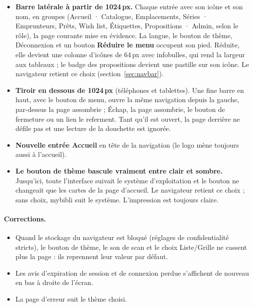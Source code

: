\begin{itemize}
  \item \textbf{Barre latérale à partir de 1024\,px.} Chaque entrée
        avec son icône et son nom, en groupes (Accueil ·
        Catalogue, Emplacements, Séries · Emprunteurs, Prêts,
        Wish list, Étiquettes, Propositions · Admin, selon le
        rôle), la page courante mise en évidence. La langue, le bouton
        de thème, Déconnexion et un bouton \textbf{Réduire le menu}
        occupent son pied. Réduite, elle devient une colonne d'icônes de
        64\,px avec infobulles, qui rend la largeur aux tableaux ; le
        badge des propositions devient une pastille sur son icône. Le
        navigateur retient ce choix (section~\ref{sec:navbar}).
  \item \textbf{Tiroir en dessous de 1024\,px} (téléphones et
        tablettes). Une fine barre en haut, avec le bouton de menu,
        ouvre la même navigation depuis la gauche, par-dessus la page
        assombrie ; Échap, la page assombrie, le bouton de fermeture ou
        un lien le referment. Tant qu'il est ouvert, la page derrière ne
        défile pas et une lecture de la douchette est ignorée.
  \item \textbf{Nouvelle entrée Accueil} en tête de la navigation (le
        logo mène toujours aussi à l'accueil).
  \item \textbf{Le bouton de thème bascule vraiment entre clair et
        sombre.} Jusqu'ici, toute l'interface suivait le système
        d'exploitation et le bouton ne changeait que les cartes de la
        page d'accueil. Le navigateur retient ce choix ; sans choix,
        mybibli suit le système. L'impression est toujours claire.
\end{itemize}

\paragraph{Corrections.}
\begin{itemize}
  \item Quand le stockage du navigateur est bloqué (réglages de
        confidentialité stricts), le bouton de thème, le son de scan et
        le choix Liste/Grille ne cassent plus la page : ils reprennent
        leur valeur par défaut.
  \item Les avis d'expiration de session et de connexion perdue
        s'affichent de nouveau en bas à droite de l'écran.
  \item La page d'erreur suit le thème choisi.
\end{itemize}

